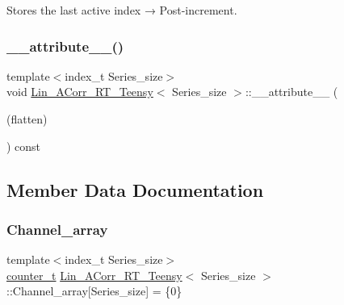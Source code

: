 Stores the last active index → Post-\/increment. 

\mbox{\label{classLin__ACorr__RT__Teensy_a0bfee7278e28c759cca2497749aeecf7}} 
\subsubsection{\texorpdfstring{\+\_\+\+\_\+attribute\+\_\+\+\_\+()}{\_\_attribute\_\_()}\hspace{0.1cm}{\footnotesize\ttfamily [2/2]}}
{\footnotesize\ttfamily template$<$index\+\_\+t Series\+\_\+size$>$ \\
void \hyperlink{classLin__ACorr__RT__Teensy}{Lin\+\_\+\+A\+Corr\+\_\+\+R\+T\+\_\+\+Teensy}$<$ Series\+\_\+size $>$\+::\+\_\+\+\_\+attribute\+\_\+\+\_\+ (\begin{DoxyParamCaption}\item[{(flatten)}]{ }\end{DoxyParamCaption}) const}



\subsection{Member Data Documentation}
\mbox{\label{classLin__ACorr__RT__Teensy_af4dda93e07198bae54553a8f11773e74}} 
\subsubsection{\texorpdfstring{Channel\+\_\+array}{Channel\_array}}
{\footnotesize\ttfamily template$<$index\+\_\+t Series\+\_\+size$>$ \\
\hyperlink{types_8hpp_ac89ac912f524b3e3fa3720ea55fec966}{counter\+\_\+t} \hyperlink{classLin__ACorr__RT__Teensy}{Lin\+\_\+\+A\+Corr\+\_\+\+R\+T\+\_\+\+Teensy}$<$ Series\+\_\+size $>$\+::Channel\+\_\+array\mbox{[}Series\+\_\+size\mbox{]} = \{0\}}

